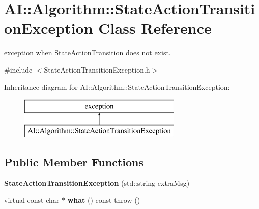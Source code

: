 \hypertarget{classAI_1_1Algorithm_1_1StateActionTransitionException}{\section{A\+I\+:\+:Algorithm\+:\+:State\+Action\+Transition\+Exception Class Reference}
\label{classAI_1_1Algorithm_1_1StateActionTransitionException}
}


exception when \hyperlink{classAI_1_1Algorithm_1_1StateActionTransition}{State\+Action\+Transition} does not exist.  




{\ttfamily \#include $<$State\+Action\+Transition\+Exception.\+h$>$}

Inheritance diagram for A\+I\+:\+:Algorithm\+:\+:State\+Action\+Transition\+Exception\+:\begin{figure}[H]
\begin{center}
\leavevmode
\includegraphics[height=2.000000cm]{classAI_1_1Algorithm_1_1StateActionTransitionException}
\end{center}
\end{figure}
\subsection*{Public Member Functions}
\begin{DoxyCompactItemize}
\item 
\hypertarget{classAI_1_1Algorithm_1_1StateActionTransitionException_a7b8bf70b19728f4b6616ae726c88fc54}{{\bfseries State\+Action\+Transition\+Exception} (std\+::string extra\+Msg)}\label{classAI_1_1Algorithm_1_1StateActionTransitionException_a7b8bf70b19728f4b6616ae726c88fc54}

\item 
\hypertarget{classAI_1_1Algorithm_1_1StateActionTransitionException_a3af53ac148abbcfd435a8da87cc92e29}{virtual const char $\ast$ {\bfseries what} () const   throw ()}\label{classAI_1_1Algorithm_1_1StateActionTransitionException_a3af53ac148abbcfd435a8da87cc92e29}

\end{DoxyCompactItemize}


